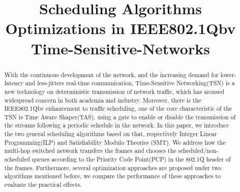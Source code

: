 \documentclass[conference]{IEEEtran}
\begin{document}
%
\title{Scheduling Algorithms Optimizations in IEEE802.1Qbv Time-Sensitive-Networks}


\author{
\and
}


\maketitle

\begin{abstract}

With the continuous development of the network, and the increasing demand for lower-latency and less-jitters real-time communication, Time-Sensitive Networking(TSN) is a new technology on deterministic transmission of network traffic, which has aroused widespread concern in both academia and industry. Moreover, there is the IEEE802.1Qbv enhancement to traffic scheduling, one of the core characteristic of the TSN is Time Aware Shaper(TAS), using a gate to enable or disable the transmission of the streams following a periodic schedule in the network. In this paper, we introduce the two general scheduling algorithms based on that, respectively Integer Linear Programming(ILP) and Satisfiability Modulo Theories (SMT). We address how the multi-hop switched network transfers the frames and chooses the scheduled/non-scheduled queues according to the Priority Code Point(PCP) in the 802.1Q header of the frames. Furthermore, several optimization approaches are proposed under two algorithms mentioned before, we compare the performance of these approaches to evaluate the practical effects.
\end{abstract}
\end{document}
